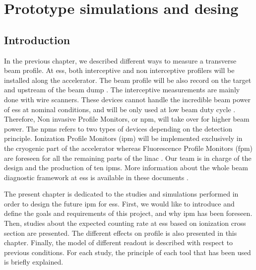 \chapter{Prototype simulations and desing}
\cleardoublepage
\minitoc
\section{Introduction}
\begin{refsection}
	\label{ch3:Introduction}
	In the previous chapter, we described different ways to measure a transverse beam profile. At \acrshort{ess}, both interceptive and non interceptive profilers will be installed along the accelerator. The beam profile will be also record on the target and upstream of the beam dump \cite{shea2013}. The interceptive measurements are mainly done with wire scanners. These devices cannot handle the incredible beam power of \acrshort{ess} at nominal conditions, and will be only used at low beam duty cycle \cite{Cheymol2013}. Therefore, Non invasive Profile Monitors, or \acrshort{npm}, will take over for higher beam power. The \acrshort{npm}s refers to two types of devices depending on the detection principle. Ionization Profile Monitors (\acrshort{ipm}) will be implemented exclusively in the cryogenic part of the accelerator whereas Fluorescence Profile Monitors (\acrshort{fpm}) are foreseen for all the remaining parts of the linac \cite{Thomas2016}. Our team is in charge of the design and the production of ten \acrshort{ipm}s. More information about the whole beam diagnostic framework at \acrshort{ess} is available in these documents \cite{Peggs2013,Shea:IBIC2017-MO2AB2}.

	The present chapter is dedicated to the studies and simulations performed in order to design the future \acrshort{ipm} for \acrshort{ess}. First, we would like to introduce and define the goals and requirements of this project, and why \acrshort{ipm} has been foreseen. Then, studies about the expected counting rate at \acrshort{ess} based on ionization cross section are presented. The different effects on profile is also presented in this chapter. Finally, the model of different readout is described with respect to previous conditions. For each study, the principle of each tool that has been used is briefly explained.


\end{refsection}
